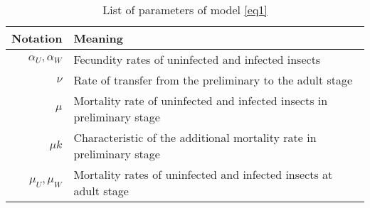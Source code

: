 \documentclass{article}%
\begin{document}
%
\normalsize%
\begin{table}
\begin{center}
\begin{tabular}{|r|l|}
\hline
Notation & Meaning\\
\hline\hline
$\alpha_U, \alpha_W$ & Fecundity rates of uninfected and infected insects\\
$\nu$ & Rate of transfer from the preliminary to the adult stage\\
$\mu$ & Mortality rate of uninfected and infected insects in preliminary stage\\
$\mu k$ & Characteristic of the additional mortality rate in preliminary stage\\
$\mu_U, \mu_W$ & Mortality rates of uninfected and infected insects at adult stage\\
\hline
\end{tabular}
\caption{List of parameters of model \eqref{eq1}}
\label{ta1}
\end{center}
\end{table}%
\end{document}
